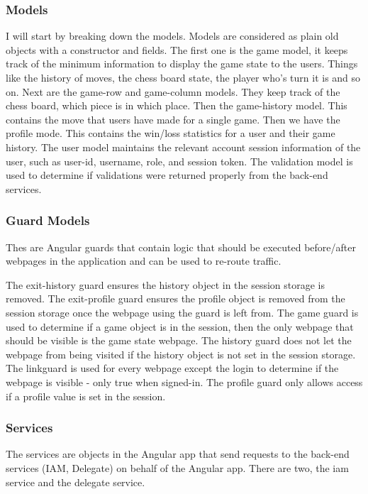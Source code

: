 \documentclass[12pt]{article}
\begin{document}
\subsubsection{Models}
I will start by breaking down the models. Models are considered as plain old objects with a constructor 
and fields. The first one is the game model, it keeps track of the minimum information to display the game 
state to the users. Things like the history of moves, the chess board state, the player who's turn it is 
and so on. Next are the game-row and game-column models. They keep track of the chess board, which piece 
is in which place. Then the game-history model. This contains the move that users have made for a single 
game. Then we have the profile mode. This contains the win/loss statistics for a user and their game history. 
The user model maintains the relevant account session information of the user, such as user-id, username, role, and 
session token. The validation model is used to determine if validations were returned properly from the back-end services.

\subsubsection{Guard Models}
Thes are Angular guards that contain logic that should be executed before/after webpages in the application and can 
be used to re-route traffic.

The exit-history guard ensures the history object in the session storage is removed. The exit-profile guard ensures 
the profile object is removed from the session storage once the webpage using the guard is left from. The game 
guard is used to determine if a game object is in the session, then the only webpage that should be visible is the 
game state webpage. The history guard does not let the webpage from being visited if the history object is not 
set in the session storage. The linkguard is used for every webpage except the login to determine if the webpage is 
visible - only true when signed-in. The profile guard only allows access if a profile value is set in the session.


\subsubsection{Services}
The services are objects in the Angular app that send requests to the back-end services (IAM, Delegate) on behalf of 
the Angular app. There are two, the iam service and the delegate service. 
\end{document}
